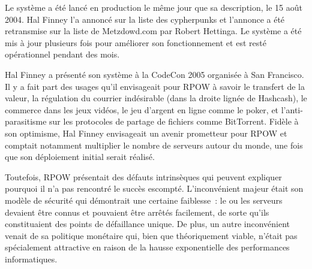 Le système a été lancé en production le même jour que sa description, le 15 août 2004. Hal Finney l'a annoncé sur la liste des cypherpunks et l'annonce a été retransmise sur la liste de Metzdowd.com par Robert Hettinga. Le système a été mis à jour plusieurs fois pour améliorer son fonctionnement et est resté opérationnel pendant des mois.

Hal Finney a présenté son système à la CodeCon 2005 organisée à San Francisco. Il y a fait part des usages qu'il envisageait pour RPOW à savoir le transfert de la valeur, la régulation du courrier indésirable (dans la droite lignée de Hashcash), le commerce dans les jeux vidéos, le jeu d'argent en ligne comme le poker, et l'anti-parasitisme sur les protocoles de partage de fichiers comme BitTorrent. Fidèle à son optimisme, Hal Finney envisageait un avenir prometteur pour RPOW et comptait notamment multiplier le nombre de serveurs autour du monde, une fois que son déploiement initial serait réalisé.

Toutefois, RPOW présentait des défauts intrinsèques qui peuvent expliquer pourquoi il n'a pas rencontré le succès escompté. L'inconvénient majeur était son modèle de sécurité qui démontrait une certaine faiblesse~: le ou les serveurs devaient être connus et pouvaient être arrêtés facilement, de sorte qu'ils constituaient des points de défaillance unique. De plus, un autre inconvénient venait de sa politique monétaire qui, bien que théoriquement viable, n'était pas spécialement attractive en raison de la hausse exponentielle des performances informatiques.

